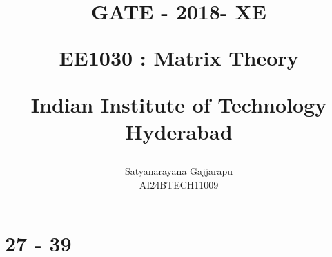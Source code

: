 \documentclass[journal]{IEEEtran}
\begin{document}

\vspace{3cm}




\title{
GATE - 2018- XE

\large{EE1030 : Matrix Theory}

Indian Institute of Technology Hyderabad
}
\author{Satyanarayana Gajjarapu

AI24BTECH11009
}	





\maketitle




\bigskip

\renewcommand{\thefigure}{\theenumi}
\renewcommand{\thetable}{\theenumi}


\section{27 - 39}
\end{document}
